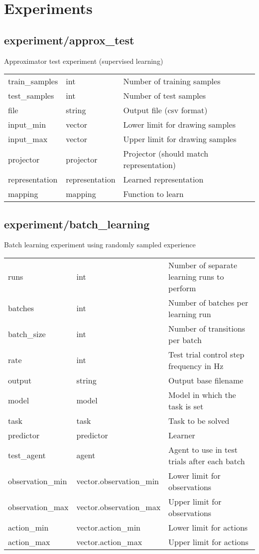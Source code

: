 \section{Experiments}
\subsection{experiment/approx\_test}
\noindent Approximator test experiment (supervised learning)\\

\noindent\begin{tabular}{@{}lll@{}}
train\_samples&int&Number of training samples\\
test\_samples&int&Number of test samples\\
file&string&Output file (csv format)\\
input\_min&vector&Lower limit for drawing samples\\
input\_max&vector&Upper limit for drawing samples\\
projector&projector&Projector (should match representation)\\
representation&representation&Learned representation\\
mapping&mapping&Function to learn\\
\end{tabular}
\subsection{experiment/batch\_learning}
\noindent Batch learning experiment using randomly sampled experience\\

\noindent\begin{tabular}{@{}lll@{}}
runs&int&Number of separate learning runs to perform\\
batches&int&Number of batches per learning run\\
batch\_size&int&Number of transitions per batch\\
rate&int&Test trial control step frequency in Hz\\
output&string&Output base filename\\
model&model&Model in which the task is set\\
task&task&Task to be solved\\
predictor&predictor&Learner\\
test\_agent&agent&Agent to use in test trials after each batch\\
observation\_min&vector.observation\_min&Lower limit for observations\\
observation\_max&vector.observation\_max&Upper limit for observations\\
action\_min&vector.action\_min&Lower limit for actions\\
action\_max&vector.action\_max&Upper limit for actions\\
\end{tabular}
\\

